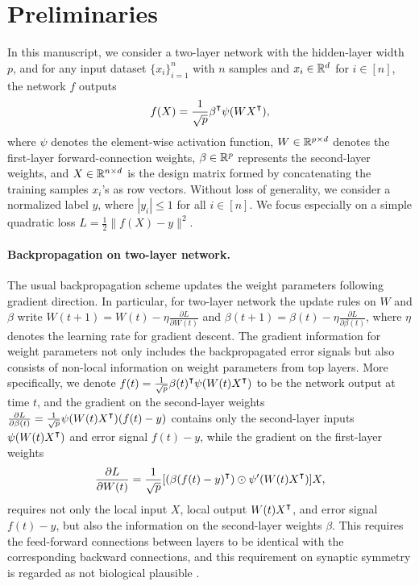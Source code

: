 \section{Preliminaries}

In this manuscript, we consider a two-layer network with the hidden-layer width $p$, and for any input dataset $\{x_i\}_{i=1}^n$ with $n$ samples and $x_i\in{\mathbb{R}^{d}}$ for $i\in[n]$, the network $f$ outputs 
\begin{align}\label{eqn:nonlinear-network}
    f(X) = \frac{1}{\sqrt p}\beta\transpose\psi(WX\transpose),
\end{align}
where $\psi$ denotes the element-wise activation function, $W\in{\mathbb{R}^{p\times d}}$ denotes the first-layer forward-connection weights, $\beta\in{\mathbb{R}^{p}}$ represents the second-layer weights, and $X\in{\mathbb{R}^{n\times d}}$ is the design matrix formed by concatenating the training samples $x_i$'s as row vectors. 
Without loss of generality, we consider a normalized label $y$, where $|y_i|\leq 1$ for all $i\in[n]$.
We focus especially on a simple quadratic loss $L = \frac{1}{2}\|f(X)-y\|^2$. 

\paragraph{Backpropagation on two-layer network.}

The usual backpropagation scheme updates the weight parameters following gradient direction. In particular, for two-layer network the update rules on $W$ and $\beta$ write $W(t+1) = W(t) - \eta \frac{\partial L}{\partial W(t)}$ and $\beta(t+1) = \beta(t) - \eta \frac{\partial L}{\partial \beta(t)}$, where $\eta$ denotes the learning rate for gradient descent. The gradient information for weight parameters not only includes the backpropagated error signals but also consists of non-local information on weight parameters from top layers. More specifically, we denote $f(t) = \frac{1}{\sqrt p}\beta(t)\transpose\psi(W(t)X\transpose)$ to be the network output at time $t$, and the gradient on the second-layer weights $\frac{\partial L}{\partial \beta(t)} = \frac{1}{\sqrt{p}} \psi(W(t) X\transpose) (f(t) - y)$ contains only the second-layer inputs $\psi(W(t) X\transpose)$ and error signal $f(t) - y$, while the gradient on the first-layer weights 
\begin{align}\label{eqn:backprop-gradient}
    \frac{\partial L}{\partial W(t)} = \frac{1}{\sqrt{p}} [(\beta (f(t) - y)\transpose)\odot \psi'(W(t)X\transpose)] X,
\end{align}
requires not only the local input $X$, local output $W(t)X\transpose$, and error signal $f(t) - y$, but also the information on the second-layer weights $\beta$.
This requires the feed-forward connections between layers to be identical with the corresponding backward connections, and this requirement on synaptic symmetry is regarded as not biological plausible \citep{lillicrap2016random}. 

